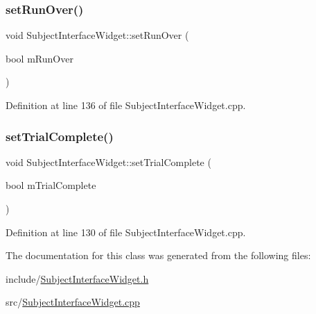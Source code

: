 \subsubsection{\texorpdfstring{set\+Run\+Over()}{setRunOver()}}
{\footnotesize\ttfamily void Subject\+Interface\+Widget\+::set\+Run\+Over (\begin{DoxyParamCaption}\item[{bool}]{m\+Run\+Over }\end{DoxyParamCaption})}



Definition at line 136 of file Subject\+Interface\+Widget.\+cpp.

\mbox{\label{class_subject_interface_widget_ae7945aaa5eb88265cb8a152617772eb2}} 
\subsubsection{\texorpdfstring{set\+Trial\+Complete()}{setTrialComplete()}}
{\footnotesize\ttfamily void Subject\+Interface\+Widget\+::set\+Trial\+Complete (\begin{DoxyParamCaption}\item[{bool}]{m\+Trial\+Complete }\end{DoxyParamCaption})}



Definition at line 130 of file Subject\+Interface\+Widget.\+cpp.



The documentation for this class was generated from the following files\+:\begin{DoxyCompactItemize}
\item 
include/\hyperlink{_subject_interface_widget_8h}{Subject\+Interface\+Widget.\+h}\item 
src/\hyperlink{_subject_interface_widget_8cpp}{Subject\+Interface\+Widget.\+cpp}\end{DoxyCompactItemize}
